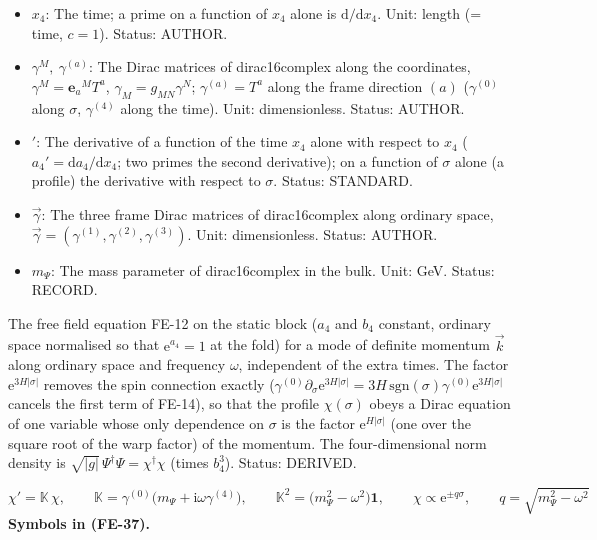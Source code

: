 \documentclass[
  10pt,
]{article}
\begin{document}
\begin{itemize}
\item
  \(x_4\): The time; a prime on a function of \(x_4\) alone is
  \(\mathrm{d}/\mathrm{d}x_4\). Unit: length (= time, \(c = 1\)).
  Status: AUTHOR.
\item
  \(\gamma^M,\ \gamma^{(a)}\): The Dirac matrices of dirac16complex
  along the coordinates, \(\gamma^M = \mathbf{e}_a{}^MT^a\),
  \(\gamma_M = g_{MN}\gamma^N\); \(\gamma^{(a)} = T^a\) along the frame
  direction \((a)\) (\(\gamma^{(0)}\) along \(\sigma\), \(\gamma^{(4)}\)
  along the time). Unit: dimensionless. Status: AUTHOR.
\item
  \({}'\): The derivative of a function of the time \(x_4\) alone with
  respect to \(x_4\) (\(a_4' = \mathrm{d}a_4/\mathrm{d}x_4\); two primes
  the second derivative); on a function of \(\sigma\) alone (a profile)
  the derivative with respect to \(\sigma\). Status: STANDARD.
\item
  \(\vec\gamma\): The three frame Dirac matrices of dirac16complex along
  ordinary space,
  \(\vec\gamma = (\gamma^{(1)}, \gamma^{(2)}, \gamma^{(3)})\). Unit:
  dimensionless. Status: AUTHOR.
\item
  \(m_\Psi\): The mass parameter of dirac16complex in the bulk. Unit:
  GeV. Status: RECORD.
\end{itemize}

The free field equation FE-12 on the static block (\(a_4\) and \(b_4\)
constant, ordinary space normalised so that \(\mathrm{e}^{a_4} = 1\) at
the fold) for a mode of definite momentum \(\vec k\) along ordinary
space and frequency \(\omega\), independent of the extra times. The
factor \(\mathrm{e}^{3H\lvert\sigma\rvert}\) removes the spin connection
exactly
(\(\gamma^{(0)}\partial_\sigma\mathrm{e}^{3H\lvert\sigma\rvert} = 3H\,\mathrm{sgn}(\sigma)\gamma^{(0)}\mathrm{e}^{3H\lvert\sigma\rvert}\)
cancels the first term of FE-14), so that the profile \(\chi(\sigma)\)
obeys a Dirac equation of one variable whose only dependence on
\(\sigma\) is the factor \(\mathrm{e}^{H\lvert\sigma\rvert}\) (one over
the square root of the warp factor) of the momentum. The
four-dimensional norm density is
\(\sqrt{\lvert g\rvert}\,\Psi^\dagger\Psi = \chi^\dagger\chi\) (times
\(b_4^3\)). Status: DERIVED.

\[
\chi' = \mathbb{K}\,\chi,\qquad \mathbb{K} = \gamma^{(0)}\big(m_\Psi + \mathrm{i}\omega\gamma^{(4)}\big),\qquad
\mathbb{K}^2 = \big(m_\Psi^2 - \omega^2\big)\mathbf{1},\qquad \chi \propto \mathrm{e}^{\pm q\sigma},\qquad q = \sqrt{m_\Psi^2 - \omega^2} \tag{FE-37}
\] \textbf{Symbols in (FE-37).}
\end{document}
